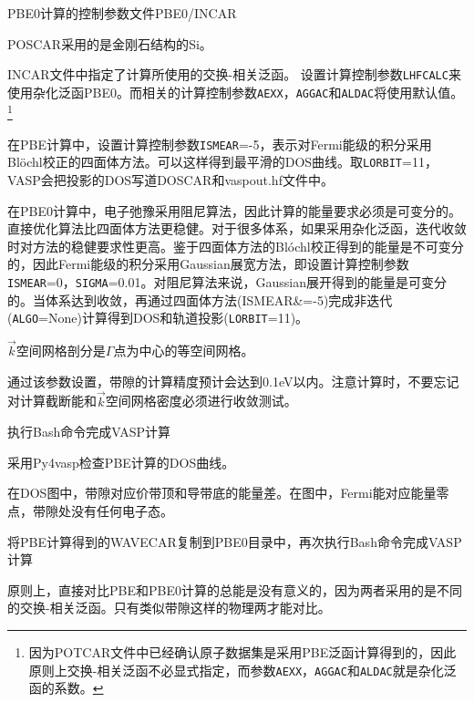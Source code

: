 \textrm{PBE0}计算的控制参数文件\textrm{PBE0/INCAR}

\textrm{POSCAR}采用的是金刚石结构的\textrm{Si}。

\textrm{INCAR}文件中指定了计算所使用的交换-相关泛函。%
设置计算控制参数\texttt{LHFCALC}来使用杂化泛函\textrm{PBE0}。而相关的计算控制参数\texttt{AEXX}，\texttt{AGGAC}和\texttt{ALDAC}将使用默认值。\footnote{因为\textrm{POTCAR}文件中已经确认原子数据集是采用\textrm{PBE}泛函计算得到的，因此原则上交换-相关泛函不必显式指定，而参数\texttt{AEXX}，\texttt{AGGAC}和\texttt{ALDAC}就是杂化泛函的系数。}

在\textrm{PBE}计算中，设置计算控制参数\texttt{ISMEAR}=-5，表示对\textrm{Fermi}能级的积分采用\textrm{Bl\"ochl}校正的四面体方法。可以这样得到最平滑的\textrm{DOS}曲线。取\texttt{LORBIT}=11，\textrm{VASP}会把投影的\textrm{DOS}写道\textrm{DOSCAR}和\textrm{vaspout.hf}文件中。

在\textrm{PBE0}计算中，电子弛豫采用阻尼算法，因此计算的能量要求必须是可变分的。直接优化算法比四面体方法更稳健。对于很多体系，如果采用杂化泛函，迭代收敛时对方法的稳健要求性更高。鉴于四面体方法的\textrm{Bl\'ochl}校正得到的能量是不可变分的，因此\textrm{Fermi}能级的积分采用\textrm{Gaussian}展宽方法，即设置计算控制参数\texttt{ISMEAR}=0，\texttt{SIGMA}=0.01。对阻尼算法来说，\textrm{Gaussian}展开得到的能量是可变分的。当体系达到收敛，再通过四面体方法(\textrm{ISMEAR}&=-5)完成非迭代(\texttt{ALGO}=\textrm{None})计算得到\textrm{DOS}和轨道投影(\texttt{LORBIT}=11)。

$\vec k$空间网格剖分是$\Gamma$点为中心的等空间网格。

通过该参数设置，带隙的计算精度预计会达到\textrm{0.1eV}以内。注意计算时，不要忘记对计算截断能和$\vec k$空间网格密度必须进行收敛测试。

执行\textrm{Bash}命令完成\textrm{VASP}计算

采用\textrm{Py4vasp}检查\textrm{PBE}计算的\textrm{DOS}曲线。

在\textrm{DOS}图中，带隙对应价带顶和导带底的能量差。在图中，\textrm{Fermi}能对应能量零点，带隙处没有任何电子态。

将\textrm{PBE}计算得到的\textrm{WAVECAR}复制到\textrm{PBE0}目录中，再次执行\textrm{Bash}命令完成\textrm{VASP}计算


原则上，直接对比\textrm{PBE}和\textrm{PBE0}计算的总能是没有意义的，因为两者采用的是不同的交换-相关泛函。只有类似带隙这样的物理两才能对比。

